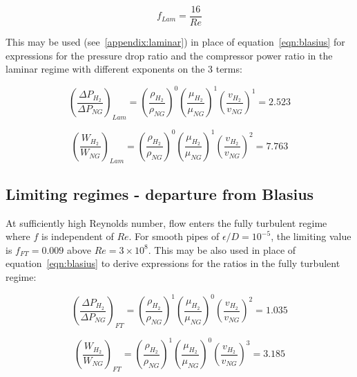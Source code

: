 \documentclass[5p]{elsarticle} %
\begin{document}
\begin{equation}
\label{eqn:flaminar}
    f_{Lam} = \frac{16}{Re}
\end{equation}

This may be used (see~\ref{appendix:laminar}) in place of equation~\eqref{eqn:blasius} for  expressions for the pressure drop ratio and the compressor power ratio in the laminar regime with different exponents on the 3 terms:

\begin{equation}
\label{eqn:pdropratiolam}
    \left(\frac{\Delta P_{H_2}}{\Delta P_{NG}}\right)_{Lam} = 
    \left(\frac{\rho_{H_2}}{\rho_{NG}}\right)^{0} 
    \left(\frac{\mu_{H_2}}{\mu_{NG}}\right)^{1} 
    \left(\frac{v_{H_2}}{v_{NG}}\right)^{1} = \mathbf{2.523}
\end{equation}

\begin{equation}
\label{eqn:powerratiolam}
    \left(\frac{W_{H_2}}{W_{NG}}\right)_{Lam} = 
    \left(\frac{\rho_{H_2}}{\rho_{NG}}\right)^{0} 
    \left(\frac{\mu_{H_2}}{\mu_{NG}}\right)^{1} 
    \left(\frac{v_{H_2}}{v_{NG}}\right)^{2} = \mathbf{7.763}
\end{equation}

\subsection{Limiting regimes - departure from Blasius}
\label{sec:departure}
At sufficiently high Reynolds number, flow enters the fully turbulent regime where $f$ is independent of $Re$.
For smooth pipes of $\epsilon/D=10^{-5}$,  the limiting value is $f_{FT} = 0.009$ above $Re = 3\times10^8$.
This may be also used in place of equation~\eqref{eqn:blasius} to derive expressions for the ratios in the fully turbulent regime:

\begin{equation}
\label{eqn:pdropratioturb}
    \left(\frac{\Delta P_{H_2}}{\Delta P_{NG}}\right)_{FT} = 
    \left(\frac{\rho_{H_2}}{\rho_{NG}}\right)^{1} 
    \left(\frac{\mu_{H_2}}{\mu_{NG}}\right)^{0} 
    \left(\frac{v_{H_2}}{v_{NG}}\right)^{2} = \mathbf{1.035}
\end{equation}

\begin{equation}
\label{eqn:powerratioturb}
    \left(\frac{W_{H_2}}{W_{NG}}\right)_{FT} = 
    \left(\frac{\rho_{H_2}}{\rho_{NG}}\right)^{1} 
    \left(\frac{\mu_{H_2}}{\mu_{NG}}\right)^{0} 
    \left(\frac{v_{H_2}}{v_{NG}}\right)^{3} = \mathbf{3.185}
\end{equation}
\end{document}
